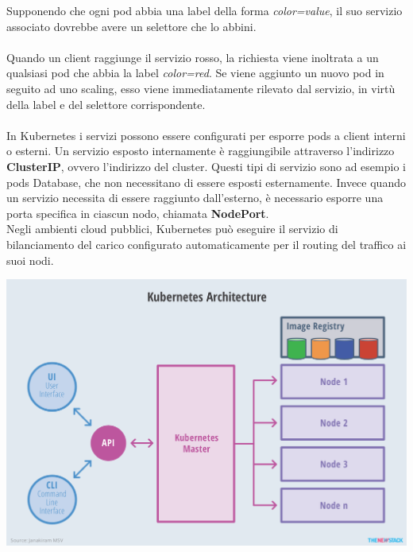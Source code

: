 \documentclass[12pt, a4paper]{report}
\begin{document}
Supponendo che ogni pod abbia una label della forma \textit{color=value}, il suo servizio associato dovrebbe avere un selettore che lo abbini.\\ \\
Quando un client raggiunge il servizio rosso, la richiesta viene inoltrata a un qualsiasi pod che abbia la label \textit{color=red}. Se viene aggiunto un nuovo pod in seguito ad uno scaling, esso viene immediatamente rilevato dal servizio, in virtù della label e del selettore corrispondente.\\ \\
In Kubernetes i servizi possono essere configurati per esporre pods a client interni o esterni. Un servizio esposto internamente è raggiungibile attraverso l'indirizzo \textbf{ClusterIP}, ovvero l'indirizzo del cluster. Questi tipi di servizio sono ad esempio i pods Database, che non necessitano di essere esposti esternamente. Invece quando un servizio necessita di essere raggiunto dall'esterno, è necessario esporre una porta specifica in ciascun nodo, chiamata \textbf{NodePort}. \\
Negli ambienti cloud pubblici, Kubernetes può eseguire il servizio di bilanciamento del carico configurato automaticamente per il routing del traffico ai suoi nodi.
\begin{center}
  \includegraphics[width=\linewidth]{Images/Kubernetes-architecture}
\end{center}
\end{document}
